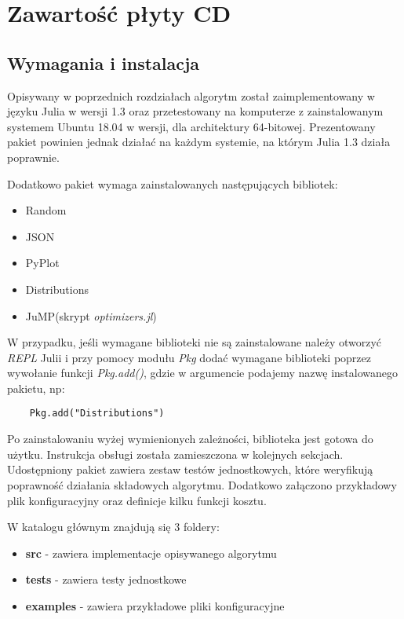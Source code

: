 \chapter{Zawartość płyty CD}
\thispagestyle{chapterBeginStyle}
\label{plytaCD}

\section{Wymagania i instalacja}

Opisywany w poprzednich rozdziałach algorytm został zaimplementowany w języku Julia w wersji 1.3 oraz przetestowany na komputerze z zainstalowanym 
systemem Ubuntu 18.04 w wersji, dla architektury 64-bitowej. Prezentowany pakiet powinien jednak działać na każdym systemie, na którym 
Julia 1.3 działa poprawnie.

Dodatkowo pakiet wymaga zainstalowanych następujących bibliotek:

\begin{itemize}
    \item Random
    \item JSON
    \item PyPlot
    \item Distributions
    \item JuMP(skrypt \textit{optimizers.jl})
\end{itemize}

W przypadku, jeśli wymagane biblioteki nie są zainstalowane należy otworzyć \textit{REPL} Julii i przy pomocy modułu \textit{Pkg} dodać wymagane 
biblioteki poprzez wywołanie funkcji \textit{Pkg.add()}, gdzie w argumencie podajemy nazwę instalowanego pakietu, np:

\begin{lstlisting}
    Pkg.add("Distributions")
\end{lstlisting}

Po zainstalowaniu wyżej wymienionych zależności, biblioteka jest gotowa do użytku. Instrukcja obsługi została zamieszczona w kolejnych sekcjach.
Udostępniony pakiet zawiera zestaw testów jednostkowych, które weryfikują poprawność działania składowych algorytmu. Dodatkowo załączono przykładowy 
plik konfiguracyjny oraz definicje kilku funkcji kosztu.

W katalogu głównym znajdują się 3 foldery:

\begin{itemize}
    \item \textbf{src} - zawiera implementacje opisywanego algorytmu
    \item \textbf{tests} - zawiera testy jednostkowe
    \item \textbf{examples} - zawiera przykładowe pliki konfiguracyjne
\end{itemize}

